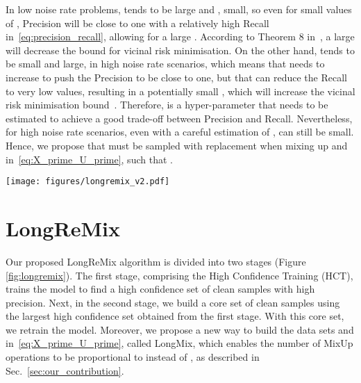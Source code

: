 \documentclass{article}
\begin{document}
In low noise rate problems,  tends to be large and , small, so even for small values of , Precision will be close to one with a relatively high Recall in~\eqref{eq:precision_recall}, allowing for a large .
According to Theorem 8 in~\cite{zhang2018generalization}, a large  will decrease the bound for vicinal risk minimisation.
On the other hand,  tends to be small and  large, in high noise rate scenarios, which means that  needs to increase to push the Precision to be close to one, but that can reduce the Recall to very low values, resulting in a potentially small , which will increase the vicinal risk minimisation bound~\cite{zhang2018generalization}.  
Therefore,  is a hyper-parameter that needs to be estimated to achieve a good trade-off between Precision and Recall. 
Nevertheless, for high noise rate scenarios, even with a careful estimation of ,  can still be small.
Hence, we propose that  must be sampled with replacement when mixing up  and  in~\eqref{eq:X_prime_U_prime}, such that . 




\begin{figure*}[!t]
\centering
\texttt{[image: figures/longremix\_v2.pdf]}
\caption{Our \textbf{proposed LongReMix method} is composed of two stages: the High Confidence Training and the Guided Training. The High Confidence Training is responsible for finding the high confidence samples. The Guided Training uses the high confidence samples to update the predicted clean set and train the model.}
\label{fig:longremix}
\end{figure*}



\section{LongReMix}
\label{sec:longremix}

Our proposed LongReMix algorithm is divided into two stages (Figure \ref{fig:longremix}). 
The first stage, comprising the High Confidence Training (HCT), trains the model to find a high confidence set of clean samples with high precision. 
Next, in the second stage, we build a core set of clean samples using the largest high confidence set obtained from the first stage.  With this core set, we retrain the model. Moreover, we propose a new way to build the data sets  and  in~\eqref{eq:X_prime_U_prime}, called LongMix,
which enables the number of MixUp operations to be proportional to  instead of  , as described in Sec.~\ref{sec:our_contribution}.
\end{document}
